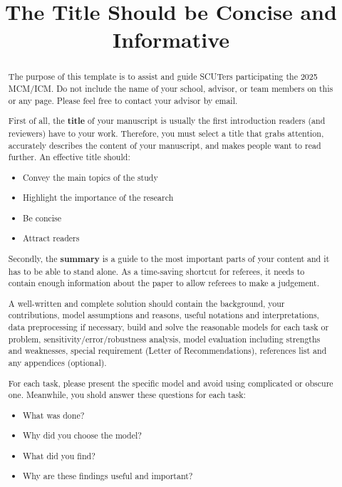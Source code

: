 \documentclass[12pt]{article}  %
\title{The Title Should be Concise and Informative}  %
\begin{document}
 
 \begin{abstract}
     
 
 
 The purpose of this template is to assist and guide SCUTers participating the 2025 MCM/ICM. Do not include the name of your school, advisor, or team members on this or any page. Please feel free to contact your advisor by email. 
     
 First of all, the \textbf{title} of your manuscript is usually the first introduction readers (and reviewers) have to your work. Therefore, you must select a title that grabs attention, accurately describes the content of your manuscript, and makes people want to read further. An effective title should:
 \begin{itemize}
     \setlength{\parsep}{0ex} %
     \setlength{\topsep}{2ex} %
     \setlength{\itemsep}{1ex} %
     \item Convey the main topics of the study
     \item Highlight the importance of the research
     \item Be concise
     \item Attract readers
 \end{itemize}
 
 Secondly, the \textbf{summary} is a guide to the most important parts of your content and it has to be able to stand alone. As a time-saving shortcut for referees, it needs to contain enough information about the paper to allow referees to make a judgement. 
   
 A well-written and complete solution should contain the background, your contributions, model assumptions and reasons, useful notations and interpretations, data preprocessing if necessary, build and solve the reasonable models for each task or problem, sensitivity/error/robustness analysis, model evaluation including strengths and weaknesses, special requirement (Letter of Recommendations), references list and any appendices (optional). 
 
 For each task, please present the specific model and avoid using complicated or obscure one. Meanwhile, you shold answer these questions for each task:
 \begin{itemize}
     \setlength{\parsep}{0ex} %
     \setlength{\topsep}{2ex} %
     \setlength{\itemsep}{1ex} %
     \item What was done?
     \item Why did you choose the model?
     \item What did you find?
     \item Why are these findings useful and important?
 \end{itemize}
 

\end{abstract}
\end{document}
